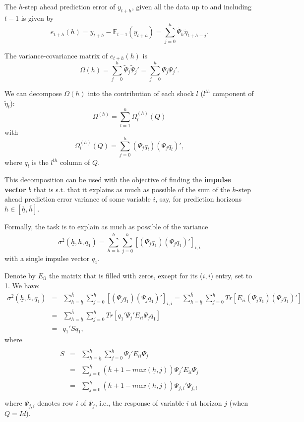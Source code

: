 \documentclass[
  12pt,
]{book}
\theoremstyle{definition}
\theoremstyle{definition}
\theoremstyle{definition}
\theoremstyle{definition}
\theoremstyle{remark}
\begin{document}
The \(h\)-step ahead prediction error of \(y_{t+h}\), given all the data up to and including \(t-1\) is given by
\[
e_{t+h}(h)=y_{t+h}-\mathbb{E}_{t-1}(y_{t+h})=\sum_{j=0}^h\tilde \Psi_h\tilde \eta_{t+h-j}.
\]

The variance-covariance matrix of \(e_{t+h}(h)\) is
\[
\Omega(h)=\sum_{j=0}^h\tilde \Psi_j\tilde \Psi_j'=\sum_{j=0}^h \Psi_j \Psi_j'.
\]

We can decompose \(\Omega(h)\) into the contribution of each shock \(l\) (\(l^{th}\) component of \(\tilde{\eta}_t\)):
\[
\Omega^{(h)}=\sum_{l=1}^n\Omega_l^{(h)}(Q)
\]
with
\[
\Omega_l^{(h)}(Q) =\sum_{j=0}^h(\Psi_jq_l)(\Psi_jq_l)',
\]
where \(q_l\) is the \(l^{th}\) column of \(Q\).

This decomposition can be used with the objective of finding the \textbf{impulse vector} \(b\) that is s.t. that it explains as much as possible of the sum of the \(h\)-step ahead prediction error variance of some variable \(i\), say, for prediction horizons \(h \in [\underline{h} , \overline{h}]\).

Formally, the task is to explain as much as possible of the variance
\[
\sigma^2(\underline{h},\overline{h},q_1)=\sum_{h=\underline{h}}^{\overline{h}} \sum_{j=0}^h\left[(\Psi_jq_1)(\Psi_jq_1)'\right]_{i,i}
\]
with a single impulse vector \(q_1\).

Denote by \(E_{ii}\) the matrix that is filled with zeros, except for its (\(i,i\)) entry, set to 1. We have:
\begin{eqnarray*}
\sigma^2(\underline{h},\overline{h},q_1)&=&\sum_{h=\underline{h}}^{\overline{h}} \sum_{j=0}^h\left[(\Psi_jq_1)(\Psi_jq_1)'\right]_{i,i}=\sum_{h=\underline{h}}^{\overline{h}} \sum_{j=0}^h Tr\left[E_{ii}(\Psi_jq_1)(\Psi_jq_1)'\right]\\
&=&\sum_{h=\underline{h}}^{\overline{h}} \sum_{j=0}^h Tr\left[q_1'\Psi_j'E_{ii}\Psi_j q_1\right]\\
&=& q_1'Sq_1,
\end{eqnarray*}
where
\begin{eqnarray*}
\begin{array}{lll}S&=&\sum_{h=\underline{h}}^{\overline{h}}\sum_{j=0}^{h}\Psi_j'E_{ii}\Psi_j\\
&=&\sum_{j=0}^{\overline{h}}(\overline{h}+1-max(\underline{h},j))\Psi_j'E_{ii}\Psi_j\\
&=&\sum_{j=0}^{\overline{h}}(\overline{h}+1-max(\underline{h},j))\Psi_{j,i}'\Psi_{j,i}\\
\end{array}
\end{eqnarray*}
where \(\Psi_{j,i}\) denotes row \(i\) of \(\Psi_{j}\), i.e., the response of variable \(i\) at horizon \(j\) (when \(Q=Id\)).
\end{document}
